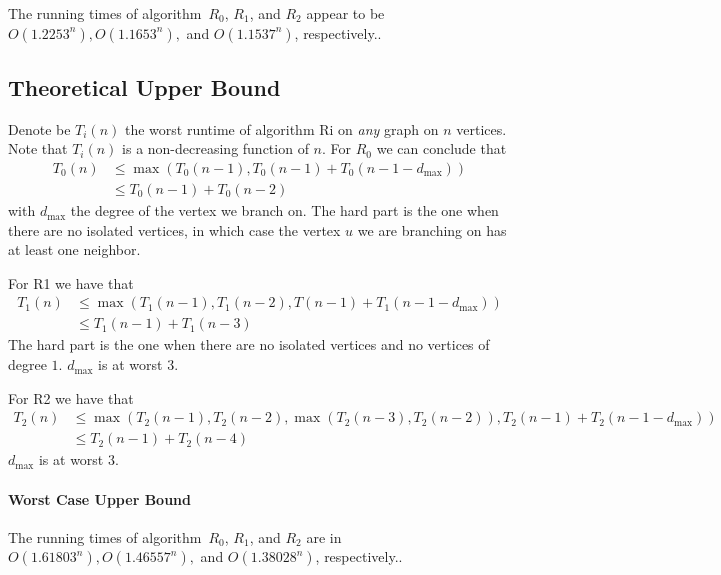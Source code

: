 \documentclass{tufte-handout}
\begin{document}
The running times of algorithm~$R_0$, $R_1$, and $R_2$ appear to be
$O(1.2253^n), O(1.1653^n),$ and $O(1.1537^n)$, respectively..

\subsection{Theoretical Upper Bound}

Denote be $T_i(n)$ the worst runtime of algorithm Ri on \emph{any} graph on $n$ vertices.
Note that $T_i(n)$ is a non-decreasing function of $n$.
For $R_0$ we can conclude that
\begin{align*}
T_0(n) &\leq\max(T_0(n-1), T_0(n-1)+T_0(n-1-d_{\mbox{max}})) \\ &\leq T_0(n-1)+T_0(n-2)
\end{align*}
with $d_{\mbox{max}}$ the degree of the vertex we branch on. The hard part is the one when there are no isolated vertices, in which case the vertex $u$ we are branching on has at least one neighbor. 

For R1 we have that
\begin{align*}
	 T_1(n) &\leq\max(T_1(n-1), T_1(n-2), T(n-1)+T_1(n-1-d_{\mbox{max}})) \\ &\leq T_1(n-1)+T_1(n-3)
\end{align*}
The hard part is the one when there are no isolated vertices and no vertices of degree $1$. $d_{\mbox{max}}$ is at worst $3$.

For R2 we have that
\begin{align*}
	T_2(n) &\leq\max(T_2(n-1), T_2(n-2), \max(T_2(n-3), T_2(n-2)), T_2(n-1) + T_2(n-1-d_{\mbox{max}})) \\ &\leq T_2(n-1) + T_2(n-4)
\end{align*}
$d_{\mbox{max}}$ is at worst $3$.

\paragraph{Worst Case Upper Bound}
The running times of algorithm~$R_0$, $R_1$, and $R_2$ are in
$O(1.61803^n),O(1.46557^n),$ and $O(1.38028^n)$, respectively.. \newpage
\end{document}
